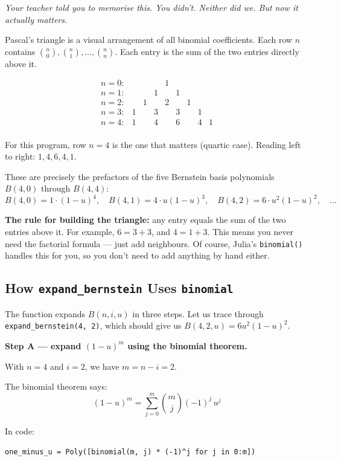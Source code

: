 \documentclass[12pt, a4paper]{article}
\newcommand{\cd}[1]{\texttt{#1}}
\begin{document}
\textit{Your teacher told you to memorise this.
You didn't. Neither did we.
But now it actually matters.}

Pascal's triangle is a visual arrangement of all binomial coefficients.
Each row $n$ contains $\binom{n}{0}, \binom{n}{1}, \ldots, \binom{n}{n}$.
Each entry is the sum of the two entries directly above it.

\[
\begin{array}{ccccccccc}
n=0: & & & & 1 & & & & \\
n=1: & & & 1 & & 1 & & & \\
n=2: & & 1 & & 2 & & 1 & & \\
n=3: & 1 & & 3 & & 3 & & 1 & \\
n=4: & 1 & & 4 & & 6 & & 4 & 1 \\
\end{array}
\]

For this program, row $n=4$ is the one that matters (quartic case).
Reading left to right: $1, 4, 6, 4, 1$.

These are precisely the prefactors of the five Bernstein
basis polynomials $B(4,0)$ through $B(4,4)$:
\[
  B(4,0) = 1\cdot(1-u)^4, \quad
  B(4,1) = 4\cdot u(1-u)^3, \quad
  B(4,2) = 6\cdot u^2(1-u)^2, \quad \ldots
\]

\begin{notebox}
\textbf{The rule for building the triangle:}
any entry equals the sum of the two entries above it.
For example, $6 = 3 + 3$, and $4 = 1 + 3$.
This means you never need the factorial formula ---
just add neighbours.
Of course, Julia's \cd{binomial()} handles this for you,
so you don't need to add anything by hand either.
\end{notebox}

\subsection{How \texttt{expand\_bernstein} Uses \texttt{binomial}}

The function expands $B(n,i,u)$ in three steps.
Let us trace through \cd{expand\_bernstein(4, 2)},
which should give us $B(4,2,u) = 6u^2(1-u)^2$.

\textbf{Step A --- expand $(1-u)^m$ using the binomial theorem.}

With $n=4$ and $i=2$, we have $m = n - i = 2$.

The binomial theorem says:
\[
  (1-u)^m = \sum_{j=0}^{m} \binom{m}{j}(-1)^j\,u^j
\]

In code:
\begin{verbatim}
one_minus_u = Poly([binomial(m, j) * (-1)^j for j in 0:m])
\end{verbatim}
\end{document}
